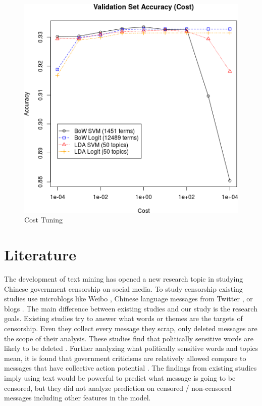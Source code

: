 \documentclass{sig-alternate-05-2015}
\begin{document}
\begin{figure}
  \centering
  \includegraphics[scale=0.5]{valid_cost.png}
  \caption{Cost Tuning}
  \label{fig:cost}
\end{figure}

\section{Literature}

The development of text mining has opened a new research topic in studying Chinese government censorship on social media. To study censorship existing studies use microblogs like Weibo \cite{bamman2012censorship, Fu2013a}, Chinese language messages from Twitter \cite{bamman2012censorship}, or blogs \cite{king2013censorship}. The main difference between existing studies and our study is the research goals. Existing studies try to answer what words \cite{bamman2012censorship, Fu2013a} or themes \cite{king2013censorship} are the targets of censorship. Even they collect every message they scrap, only deleted messages are the scope of their analysis. These studies find that politically sensitive words are likely to be deleted \cite{bamman2012censorship, Fu2013a}. Further analyzing what politically sensitive words and topics mean, it is found that government criticisms are relatively allowed compare to messages that have collective action potential \cite{king2013censorship}. The findings from existing studies imply using text would be powerful to predict what message is going to be censored, but they did not analyze prediction on censored / non-censored messages including other features in the model. 
\end{document}
